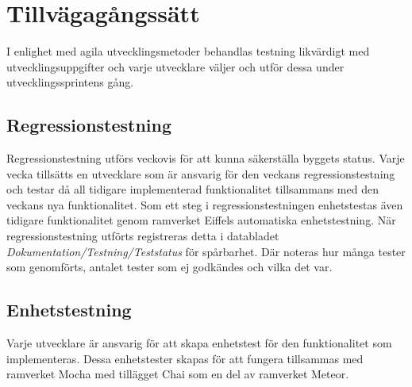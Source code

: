 \section{Tillvägagångssätt}
I enlighet med agila utvecklingsmetoder behandlas testning likvärdigt med utvecklingsuppgifter och varje utvecklare väljer och utför dessa under utvecklingssprintens gång. \\
\subsection{Regressionstestning}
Regressionstestning utförs veckovis för att kunna säkerställa byggets status. Varje vecka tillsätts en utvecklare som är ansvarig för den veckans regressionstestning och testar då all tidigare implementerad funktionalitet tillsammans med den veckans nya funktionalitet. Som ett steg i regressionstestningen enhetstestas även tidigare funktionalitet genom ramverket Eiffels automatiska enhetstestning. När regressionstestning utförts registreras detta i databladet \textit{Dokumentation/Testning/Teststatus} för spårbarhet. Där noteras hur många tester som genomförts, antalet tester som ej godkändes och vilka det var. 
\\
\subsection{Enhetstestning}
Varje utvecklare är ansvarig för att skapa enhetstest för den funktionalitet som implementeras. Dessa enhetstester skapas för att fungera tillsammas med ramverket Mocha\cite{mochawebsite} med tillägget Chai\cite{chaiwebsite} som en del av ramverket Meteor\cite{meteorwebsite}. 

